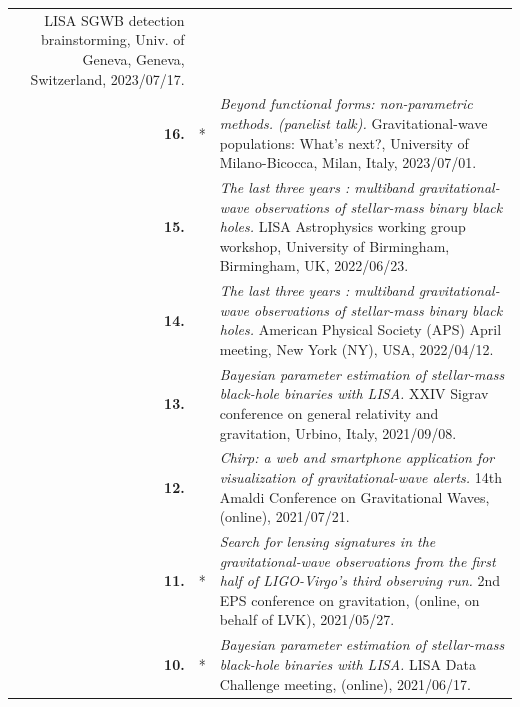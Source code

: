 {\begin{longtable}{rp{0.3cm}p{15.8cm}}
\newline{}
LISA SGWB detection brainstorming, Univ. of Geneva, Geneva, Switzerland, 2023/07/17.
\vspace{0.05cm}\\
%
\textbf{16.} & * & \textit{Beyond functional forms: non-parametric methods. (panelist talk).}
\newline{}
Gravitational-wave populations: What's next?, University of Milano-Bicocca, Milan, Italy, 2023/07/01.
\vspace{0.05cm}\\
%
\textbf{15.} &  & \textit{The last three years : multiband gravitational-wave observations of stellar-mass binary black holes.}
\newline{}
LISA Astrophysics working group workshop, University of Birmingham, Birmingham, UK, 2022/06/23.
\vspace{0.05cm}\\
%
\textbf{14.} &  & \textit{The last three years : multiband gravitational-wave observations of stellar-mass binary black holes.}
\newline{}
American Physical Society (APS) April meeting, New York (NY), USA, 2022/04/12.
\vspace{0.05cm}\\
%
\textbf{13.} &  & \textit{Bayesian parameter estimation of stellar-mass black-hole binaries with LISA.}
\newline{}
XXIV Sigrav conference on general relativity and gravitation, Urbino, Italy, 2021/09/08.
\vspace{0.05cm}\\
%
\textbf{12.} &  & \textit{Chirp: a web and smartphone application for visualization of gravitational-wave alerts.}
\newline{}
14th Amaldi Conference on Gravitational Waves, (online), 2021/07/21.
\vspace{0.05cm}\\
%
\textbf{11.} & * & \textit{Search for lensing signatures in the gravitational-wave observations from the first half of LIGO-Virgo’s third observing run.}
\newline{}
2nd EPS conference on gravitation, (online, on behalf of LVK), 2021/05/27.
\vspace{0.05cm}\\
%
\textbf{10.} & * & \textit{Bayesian parameter estimation of stellar-mass black-hole binaries with LISA.}
\newline{}
LISA Data Challenge meeting, (online), 2021/06/17.
\vspace{0.05cm}\\

\end{longtable}}
